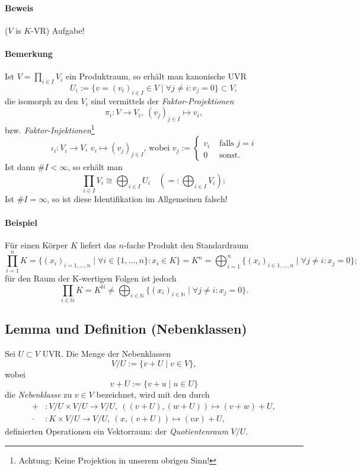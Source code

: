 \paragraph{Beweis} ($V$ is $K$-VR) Aufgabe!

\paragraph{Bemerkung} 
	Ist $V = \prod_{i\in I} V_i$ ein Produktraum, so erhält man kanonische UVR
		\[U_i:=\{v=(v_i)_{i\in I}\in V\mid\forall j \neq i:v_j = 0\}\subset V,\]
	die isomorph zu den $V_i$ sind vermittels der \emph{Faktor-Projektionen}
		\[\pi_i:V\to V_i,\ (v_j)_{j\in I} \mapsto v_i,\]
	bzw. \emph{Faktor-Injektionen}\footnote{Achtung: Keine Projektion in unserem obrigen Sinn!}
		\[\iota_i:V_i\to V,\ v_i \mapsto(v_j)_{j\in I}\text{, wobei }v_j :=
			\begin{cases}
				v_i &\text{ falls } j=i\\
				0 &\text{ sonst.}
			\end{cases}
		\]
	Ist dann $\# I < \infty$, so erhält man
		\[\prod_{i\in I} V_i\cong \bigoplus_{i\in I}U_i\quad (=: \bigoplus_{i\in I}V_i);\]
	Ist $\#I=\infty$, so ist diese Identifikation im Allgemeinen falsch!
	
\paragraph{Beispiel}
	Für einen Körper $ K $ liefert das $ n $-fache Produkt den Standardraum
		\[\prod_{i=1}^{n}K = \{(x_i)_{i = 1,...,n}\mid\forall i \in \{1,...,n\}: x_i \in K\} = K^n = \bigoplus_{i=1}^n\{(x_i)_{i\in {1,...,n}}\mid\forall j\neq i: x_j = 0\};\]
	für den Raum der K-wertigen Folgen ist jedoch
		\[\prod_{i\in \mathbb{N}}K=K^{\mathbb{N}}\neq\bigoplus_{i\in \mathbb{N}}\{(x_i)_{i\in \mathbb{N}}\mid\forall j\neq i: x_j=0\}.\]
			
\subsection{Lemma und Definition (Nebenklassen)}
	\begin{Definition}[Nebenklassen]
		Sei $U\subset V$ UVR. Die Menge der Nebenklassen 
		\[V/U := \{v+U\mid v\in V\},\]
	wobei
		\[v+U:=\{v+u\mid u\in U\}\]
	die \emph{Nebenklasse} zu $v\in V$ bezeichnet, wird mit den durch
		\begin{align*}
			+&: V/U \times V/U \to V/U,\ ((v+U),(w+U))\mapsto (v+w)+U,\\
			\cdot &: K\times V/U \to V/U,\ (x,(v+U))\mapsto (vx)+U,
		\end{align*}
	definierten Operationen ein Vektorraum: der \emph{Quotientenraum} $V/U$.
	\end{Definition}
			
